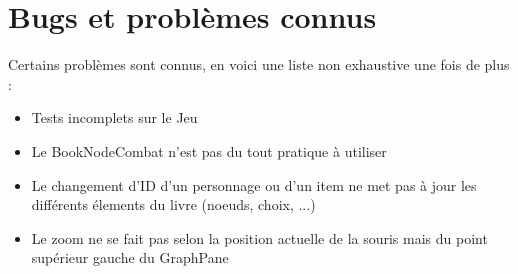 	\section{Bugs et problèmes connus}

		Certains problèmes sont connus, en voici une liste non exhaustive une fois de plus :

		\begin{itemize}
			\item{Tests incomplets sur le Jeu}
			\item{Le BookNodeCombat n'est pas du tout pratique à utiliser}
			\item{Le changement d'ID d'un personnage ou d'un item ne met pas à jour les différents élements du livre (noeuds, choix, ...)}
			\item{Le zoom ne se fait pas selon la position actuelle de la souris mais du point supérieur gauche du GraphPane}
		\end{itemize}

